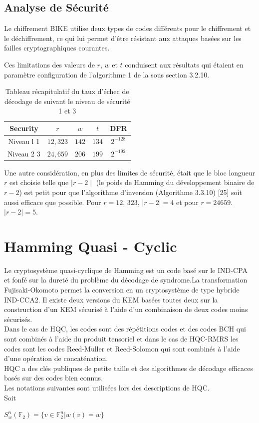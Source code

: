 \documentclass[12pt,openany]{report}
\begin{document}
\subsection{Analyse de Sécurité}
 Le chiffrement BIKE utilise deux types de codes différents pour le chiffrement et le déchiffrement, ce qui lui permet d'être résistant aux attaques basées sur les failles cryptographiques courantes.

Ces limitations des valeurs de $r$, $w$ et $t$ conduisent aux résultats qui étaient en paramètre
configuration de l'algorithme 1 de la sous section 3.2.10.

\begin{table}
\centering
\begin{tabular}{ |c|c c c|c|}
\hline
Security  &$r$ & $w$ & $t$& DFR\\
\hline
Niveau l 1 &$12,323$ &$142$&$134$&$2^{-128}$\\
Niveau 2 3 &$24,659$ &$206$ &$199$&$2^{-192}$\\
\hline
\end{tabular}
\caption{Tableau récapitulatif du taux d'échec de décodage de suivant le niveau de sécurité  1 et 3}
\label{bike_1}
\end{table}


Une autre considération, en plus des limites de sécurité, était que le bloc
longueur $r$ est choisie telle que $\mid  r-2 \mid $ (le poids de Hamming du développement binaire
de $r-2$) est petit pour que l'algorithme d'inversion (Algorithme 3.3.10) [25] soit aussi
efficace que possible. Pour $r = 12$, $323$, $\mid r-2\mid = 4$ et pour $r = 24659$. $\mid r-2 \mid = 5$.


\section{Hamming Quasi - Cyclic}
Le cryptosystème quasi-cyclique de Hamming est un code basé sur le  IND-CPA  et fonfé sur la dureté du problème du décodage de syndrome.La transformation Fujisaki-Okomoto permet la conversion en un cryptosystème de type hybride IND-CCA2.
Il existe deux versions du KEM basées toutes deux sur la construction d’un KEM sécurisé à l’aide d’un
combinaison de deux codes moins sécurisés.\\Dans le cas de HQC, les codes sont des répétitions
codes et des codes BCH qui sont combinés à l’aide du produit tensoriel et dans le cas
de HQC-RMRS les codes sont les codes Reed-Muller et Reed-Solomon qui sont combinés à l’aide d’une opération de concaténation.\\HQC a des clés publiques de petite taille et des algorithmes de décodage efficaces basés sur des codes bien connus.
\\ Les notations suivantes sont utilisées lors des descriptions de HQC.\\Soit 
\begin{center}

$  \mathit{S}_w^n(\mathbb{F}_2)=\lbrace v \in \mathbb{F}_2^n | w(v)=w \rbrace  $

\end{center}
\end{document}
